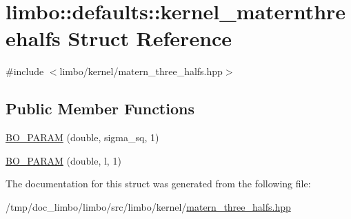 \hypertarget{structlimbo_1_1defaults_1_1kernel__maternthreehalfs}{}\section{limbo\+:\+:defaults\+:\+:kernel\+\_\+maternthreehalfs Struct Reference}
\label{structlimbo_1_1defaults_1_1kernel__maternthreehalfs}


{\ttfamily \#include $<$limbo/kernel/matern\+\_\+three\+\_\+halfs.\+hpp$>$}

\subsection*{Public Member Functions}
\begin{DoxyCompactItemize}
\item 
\hyperlink{group__kernel__defaults_ga5cf36a497746c36b6bded9c6fb368ae6}{B\+O\+\_\+\+P\+A\+R\+A\+M} (double, sigma\+\_\+sq, 1)
\item 
\hyperlink{group__kernel__defaults_ga8764c13406e6fe0ab8f3c79d200c5e96}{B\+O\+\_\+\+P\+A\+R\+A\+M} (double, l, 1)
\end{DoxyCompactItemize}


The documentation for this struct was generated from the following file\+:\begin{DoxyCompactItemize}
\item 
/tmp/doc\+\_\+limbo/limbo/src/limbo/kernel/\hyperlink{matern__three__halfs_8hpp}{matern\+\_\+three\+\_\+halfs.\+hpp}\end{DoxyCompactItemize}
